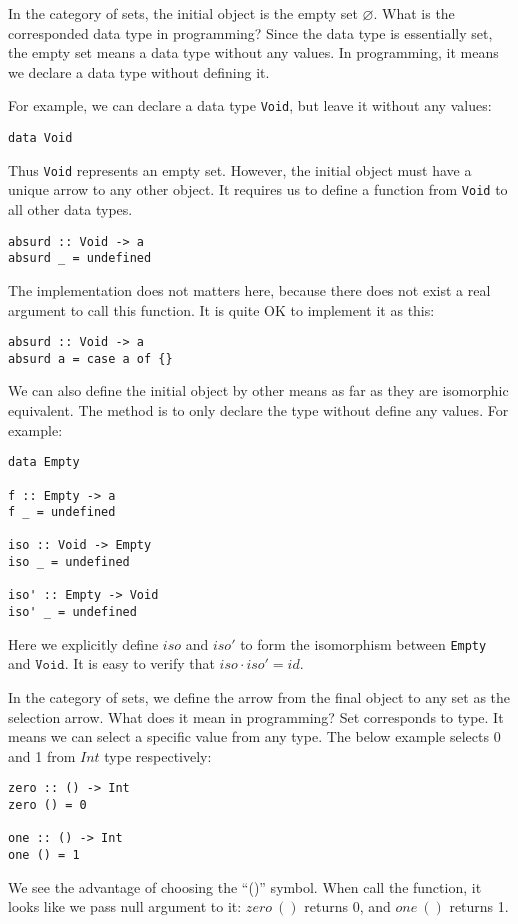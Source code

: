 \documentclass{article}
\begin{document}
\begin{example}
In the category of sets, the initial object is the empty set $\varnothing$. What is the corresponded data type in programming? Since the data type is essentially set, the empty set means a data type without any values. In programming, it means we declare a data type without defining it.

For example, we can declare a data type \texttt{Void}, but leave it without any values:

\begin{lstlisting}
data Void
\end{lstlisting}

Thus \texttt{Void} represents an empty set. However, the initial object must have a unique arrow to any other object. It requires us to define a function from \texttt{Void} to all other data types.

\begin{lstlisting}
absurd :: Void -> a
absurd _ = undefined
\end{lstlisting}

The implementation does not matters here, because there does not exist a real argument to call this function. It is quite OK to implement it as this:

\begin{lstlisting}
absurd :: Void -> a
absurd a = case a of {}
\end{lstlisting}

We can also define the initial object by other means as far as they are isomorphic equivalent. The method is to only declare the type without define any values. For example:

\begin{lstlisting}
data Empty

f :: Empty -> a
f _ = undefined

iso :: Void -> Empty
iso _ = undefined

iso' :: Empty -> Void
iso' _ = undefined
\end{lstlisting}

Here we explicitly define $iso$ and $iso'$ to form the isomorphism between \texttt{Empty} and $\texttt{Void}$. It is easy to verify that $iso \cdot iso' = id$.

In the category of sets, we define the arrow from the final object to any set as the selection arrow. What does it mean in programming? Set corresponds to type. It means we can select a specific value from any type. The below example selects 0 and 1 from $Int$ type respectively:

\begin{lstlisting}
zero :: () -> Int
zero () = 0

one :: () -> Int
one () = 1
\end{lstlisting}

We see the advantage of choosing the ``()'' symbol. When call the function, it looks like we pass null argument to it: $zero\ ()$ returns 0, and $one\ ()$ returns 1.
\end{example}
\end{document}
